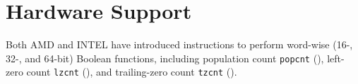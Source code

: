 \section{Hardware Support}
\label{hardwaresupport}

Both AMD and INTEL have introduced instructions to perform
word-wise (16-, 32-, and 64-bit) Boolean functions, 
including population count {\tt popcnt} ({\apl \qplus\qslash\qomega}),
left-zero count {\tt lzcnt} ({\apl \qomega\qiota{}}), 
and trailing-zero count {\tt tzcnt} 
({\apl \qlpar\qrotate\qomega\qrpar\qiota{}}).~\cite{INTEL:avx,AMD:instructions}
